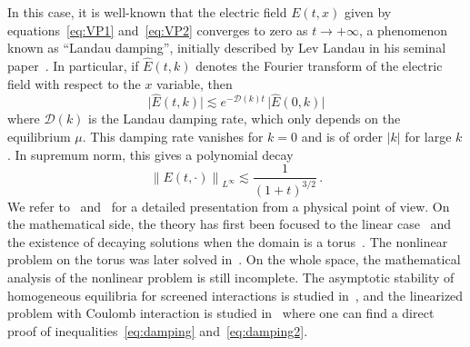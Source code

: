 \documentclass[a4paper,12pt]{amsart} %
\theoremstyle{plain}
\theoremstyle{definition}
\newcommand		{\lt}			{\left}				%
\newcommand		{\rt}			{\right}			%
\renewcommand	{\(}			{\lt(}
\renewcommand	{\)}			{\rt)}
\newcommand		{\n}[1]			{\lt\lvert{#1}\rt\rvert}	%
\newcommand		{\sabs}[1]		{\lvert{#1}\rvert}
\newcommand		{\nrm}[1]		{\lt\lVert{#1}\rt\rVert}		%
\newcommand		{\Nrm}[2]		{\nrm{#1}_{#2}}
\begin{document}
	In this case, it is well-known that the electric field $E(t,x)$ given by equations~\eqref{eq:VP1} and~\eqref{eq:VP2} converges to zero as $t \to + \infty$, a phenomenon known as ``Landau damping'', initially described by Lev Landau in his seminal paper~\cite{landau_vibrations_1946}. In particular, if $\widehat{E}(t,k)$ denotes the Fourier transform of the electric field with respect to the $x$ variable, then
	\begin{equation}\label{eq:damping}
		\sabs{\widehat{E}(t,k)} \lesssim e^{- \mathcal{D}(k) t}\, \sabs{\widehat{E}(0,k)}
	\end{equation}
	where $\mathcal{D}(k)$ is the Landau damping rate, which only depends on the equilibrium $\mu$. This damping rate vanishes for $k = 0$ and is of order $\n{k}$ for large $k$. In supremum norm, this gives a polynomial decay
	\begin{equation} \label{eq:damping2}
		\Nrm{E(t,\cdot)}{L^\infty} \lesssim \frac{1}{(1 + t)^{3/2}} \, .
	\end{equation}
	We refer to~\cite{landau_vibrations_1946} and~\cite{schekochihin_lectures_2023} for a detailed presentation from a physical point of view. On the mathematical side, the theory has first been focused to the linear case~\cite{maslov_linear_1986, degond_spectral_1986} and the existence of decaying solutions when the domain is a torus~\cite{caglioti_time_1998, hwang_existence_2009}. The nonlinear problem on the torus was later solved in~\cite{mouhot_landau_2011, bedrossian_landau_2016, grenier_landau_2021, ionescu_nonlinear_2024}. On the whole space, the mathematical analysis of the nonlinear problem is still incomplete. The asymptotic stability of homogeneous equilibria for screened interactions is studied in~\cite{bedrossian_landau_2018, han-kwan_asymptotic_2021}, and the linearized problem with Coulomb interaction is studied in~\cite{han-kwan_linearized_2021, bedrossian_linearized_2022, bian_linear_2024} where one can find a direct proof of inequalities~\eqref{eq:damping} and~\eqref{eq:damping2}.
	


	
\end{document}
